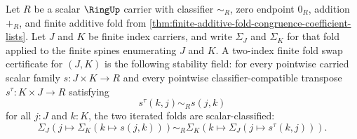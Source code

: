 \begin{definition}
\label{def:two-index-finite-fold-swap-certificate}
Let $R$ be a scalar $\RingUp$ carrier with classifier $\sim_R$, zero endpoint $0_R$, addition $+_R$, and finite additive fold from \autoref{thm:finite-additive-fold-congruence-coefficient-lists}. Let $J$ and $K$ be finite index carriers, and write $\Sigma_J$ and $\Sigma_K$ for that fold applied to the finite spines enumerating $J$ and $K$. A two-index finite fold swap certificate for $(J,K)$ is the following stability field: for every pointwise carried scalar family $s:J\times K\to R$ and every pointwise classifier-compatible transpose $s^\tau:K\times J\to R$ satisfying
$$
s^\tau(k,j)\sim_R s(j,k)
$$
for all $j:J$ and $k:K$, the two iterated folds are scalar-classified:
$$
\Sigma_J(j\mapsto \Sigma_K(k\mapsto s(j,k)))
\sim_R
\Sigma_K(k\mapsto \Sigma_J(j\mapsto s^\tau(k,j))).
$$
\end{definition}

